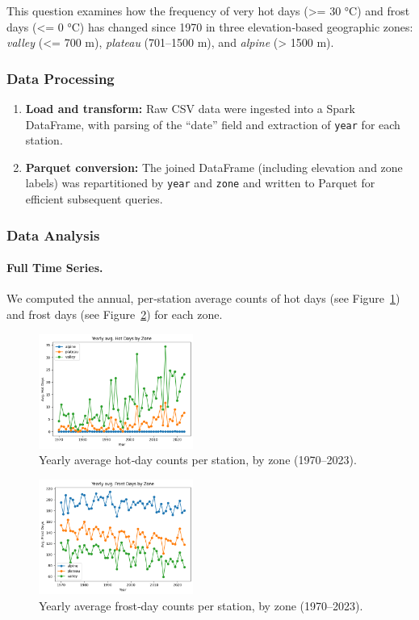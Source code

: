 This question examines how the frequency of very hot days (>= 30 °C) and frost days (<= 0 °C) has changed since 1970 in three elevation‐based geographic zones:
\emph{valley} (<= 700 m), \emph{plateau} (701–1500 m), and \emph{alpine} (> 1500 m).

\subsubsection{Data Processing}
\begin{enumerate}
  \item \textbf{Load and transform:} Raw CSV data were ingested into a Spark DataFrame, with parsing of the “date” field and extraction of \texttt{year} for each station.
  \item \textbf{Parquet conversion:} The joined DataFrame (including elevation and zone labels) was repartitioned by \texttt{year} and \texttt{zone} and written to Parquet for efficient subsequent queries.
\end{enumerate}

\subsubsection{Data Analysis}
\paragraph{Full Time Series.}
We computed the annual, per‐station average counts of hot days (see Figure~\ref{fig:full_time_series_hot}) and frost days (see Figure~\ref{fig:full_time_series_frost}) for each zone.
\begin{figure}[ht]
  \centering
    \includegraphics[width=0.45\textwidth]{img/full_time_series_hot.png}
  \caption{Yearly average hot‐day counts per station, by zone (1970–2023).}
  \label{fig:full_time_series_hot}
\end{figure}
\begin{figure}[ht]
  \centering
    \includegraphics[width=0.45\textwidth]{img/full_time_series_frost.png}
  \caption{Yearly average frost‐day counts per station, by zone (1970–2023).}
  \label{fig:full_time_series_frost}
\end{figure}

